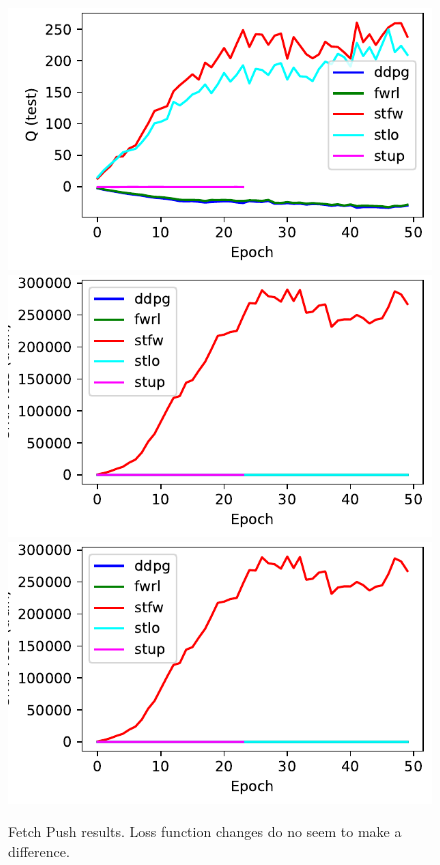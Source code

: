 \begin{figure}
  \includegraphics[width=\frac\columnwidth]{media/res/f84daa7-FetchPush-v1-stfw-none/test/mean_Q.pdf}%
  \includegraphics[width=\frac\columnwidth]{media/res/f84daa7-FetchPush-v1-stfw-none/train/critic_loss.pdf}%
  \includegraphics[width=\frac\columnwidth]{media/res/f84daa7-FetchPush-v1-stfw-none/train/critic_loss.pdf}
  \caption{
    Fetch Push results. Loss function changes do no seem to make a difference.}%
  \label{fig:fwrl-stepfwrl-noop-FetchPush}%
\end{figure}%
% 

